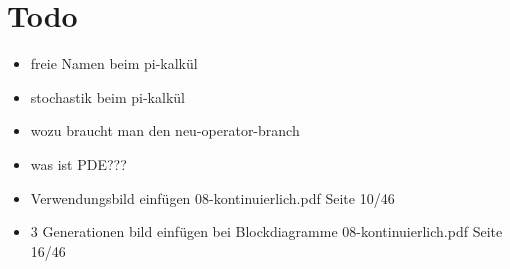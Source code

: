 \documentclass[11pt, fleqn, a4paper, leqno]{scrartcl} %
\begin{document}
\section{Todo}
	\begin{itemize}
		\item freie Namen beim pi-kalkül
		\item stochastik beim pi-kalkül
		\item wozu braucht man den neu-operator-branch
		\item was ist PDE???
		\item Verwendungsbild einfügen 08-kontinuierlich.pdf Seite 10/46
		\item 3 Generationen bild einfügen bei Blockdiagramme 08-kontinuierlich.pdf Seite 16/46
	\end{itemize}			
\end{document}
